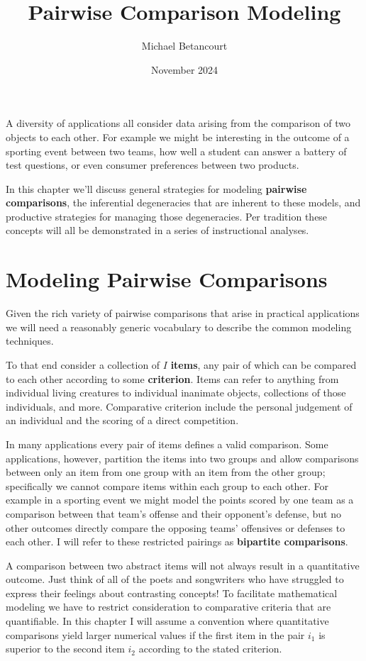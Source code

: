 \documentclass[
  letterpaper,
  DIV=11,
  numbers=noendperiod]{scrartcl}
\title{Pairwise Comparison Modeling}
\author{Michael Betancourt}
\date{November 2024}
\renewcommand*\contentsname{Table of contents}
\newcommand\contentsname{Table of contents}
\begin{document}
\maketitle

\renewcommand*\contentsname{Table of contents}
{
\hypersetup{linkcolor=}
\setcounter{tocdepth}{3}
\tableofcontents
}
A diversity of applications all consider data arising from the
comparison of two objects to each other. For example we might be
interesting in the outcome of a sporting event between two teams, how
well a student can answer a battery of test questions, or even consumer
preferences between two products.

In this chapter we'll discuss general strategies for modeling
\textbf{pairwise comparisons}, the inferential degeneracies that are
inherent to these models, and productive strategies for managing those
degeneracies. Per tradition these concepts will all be demonstrated in a
series of instructional analyses.

\section{Modeling Pairwise Comparisons}\label{sec:pair-comps}

Given the rich variety of pairwise comparisons that arise in practical
applications we will need a reasonably generic vocabulary to describe
the common modeling techniques.

To that end consider a collection of \(I\) \textbf{items}, any pair of
which can be compared to each other according to some
\textbf{criterion}. Items can refer to anything from individual living
creatures to individual inanimate objects, collections of those
individuals, and more. Comparative criterion include the personal
judgement of an individual and the scoring of a direct competition.

In many applications every pair of items defines a valid comparison.
Some applications, however, partition the items into two groups and
allow comparisons between only an item from one group with an item from
the other group; specifically we cannot compare items within each group
to each other. For example in a sporting event we might model the points
scored by one team as a comparison between that team's offense and their
opponent's defense, but no other outcomes directly compare the opposing
teams' offensives or defenses to each other. I will refer to these
restricted pairings as \textbf{bipartite comparisons}.

A comparison between two abstract items will not always result in a
quantitative outcome. Just think of all of the poets and songwriters who
have struggled to express their feelings about contrasting concepts! To
facilitate mathematical modeling we have to restrict consideration to
comparative criteria that are quantifiable. In this chapter I will
assume a convention where quantitative comparisons yield larger
numerical values if the first item in the pair \(i_{1}\) is superior to
the second item \(i_{2}\) according to the stated criterion.
\end{document}

